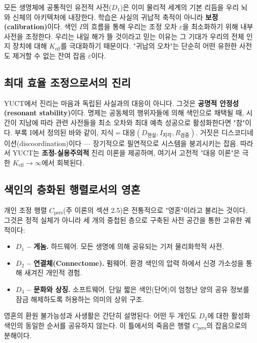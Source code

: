 \documentclass[12pt,a4paper]{article}
\newcommand{\Keff}{K_{\mathrm{eff}}}
\begin{document}
	모든 생명체에 공통적인 유전적 사전(\(D_1\))은 이미 물리적 세계의 기본 리듬을 우리 뇌와 신체의 아키텍처에 내장한다. 학습은 사실의 귀납적 축적이 아니라 \textbf{보정(calibration)}이다. 색인 \(I\)의 흐름을 통해 우리는 조정 오차 \(\varepsilon\)을 최소화하기 위해 내부 사전을 조정한다. 우리는 내일 해가 뜰 것이라고 믿는 이유는 그 기대가 우리의 전체 인지 장치에 대해 \(\Keff\)를 극대화하기 때문이다. "귀납의 오차"는 단순히 어떤 유한한 사전도 제거할 수 없는 잔여 잡음 \(\varepsilon\)이다.
	
	\subsection{최대 효율 조정으로서의 진리}
	
	YUCT에서 진리는 마음과 독립된 사실과의 대응이 아니다. 그것은 \textbf{공명적 안정성(resonant stability)}이다. 명제는 공동체의 행위자들에 의해 색인으로 채택될 때, 시간이 지남에 따라 관련 사전들을 최소 오차와 최대 예측 성공으로 활성화한다면 "참"이다. 부록 I에서 정의된 바와 같이, \(\text{지식} = \text{대응}(D_{\text{현실}}, I_{\text{지각}}, R_{\text{검증}})\). 거짓은 디스코디네이션(discoordination)이다 — 장기적으로 필연적으로 시스템을 붕괴시키는 잡음. 따라서 YUCT는 \textbf{조정-실용주의적} 진리 이론을 제공하며, 여기서 고전적 "대응 이론"은 극한 \(\Keff \to \infty\)에서 회복된다.
	
	\subsection{색인의 층화된 행렬로서의 영혼}
	
	개인 조정 행렬 \(C_{\mathrm{pers}}\)(주 이론의 섹션 2.5)은 전통적으로 "영혼"이라고 불리는 것이다. 그것은 정적 실체가 아니라 세 개의 중첩된 층으로 구축된 사전 공간을 통한 고유한 궤적이다:
	
	\begin{itemize}[leftmargin=*]
		\item \textbf{\(D_1\) – 게놈.} 하드웨어. 모든 생명에 의해 공유되는 기저 물리화학적 사전.
		\item \textbf{\(D_2\) – 연결체(Connectome).} 펌웨어. 환경 색인의 압력 하에서 신경 가소성을 통해 새겨진 개인적 경험.
		\item \textbf{\(D_3\) – 문화와 상징.} 소프트웨어. 단일 짧은 색인(단어)이 엄청난 양의 공유 정보를 잠금 해제하도록 허용하는 의미의 상위 구조.
	\end{itemize}
	
	영혼의 환원 불가능성과 사생활은 간단히 설명된다: 어떤 두 개인도 \(D_2\)에 대한 활성화 색인의 동일한 순서를 공유하지 않는다. 이 틀에서의 죽음은 행렬 \(C_{\mathrm{pers}}\)의 잡음으로의 분해이다.
	
\end{document}
